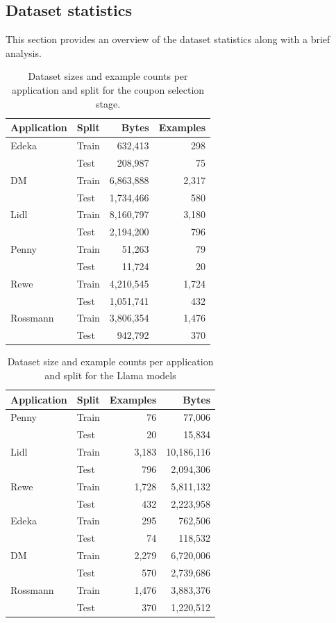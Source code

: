 \documentclass[licencjacka,en]{pracamgr}
\begin{document}
\subsection{Dataset statistics}
This section provides an overview of the dataset statistics along with a brief analysis.

\begin{table}[h!]
\centering
\begin{tabular}{|l|l|r|r|}
\hline
\textbf{Application} & \textbf{Split} & \textbf{Bytes} & \textbf{Examples} \\
\hline
Edeka     & Train & 632,413  & 298 \\
          & Test  & 208,987  & 75 \\
DM        & Train & 6,863,888 & 2,317 \\
          & Test  & 1,734,466 & 580 \\
Lidl      & Train & 8,160,797 & 3,180 \\
          & Test  & 2,194,200 & 796 \\
Penny     & Train & 51,263   & 79 \\
          & Test  & 11,724   & 20 \\
Rewe      & Train & 4,210,545 & 1,724 \\
          & Test  & 1,051,741 & 432 \\
Rossmann  & Train & 3,806,354 & 1,476 \\
          & Test  & 942,792  & 370 \\
\hline
\end{tabular}
\caption{Dataset sizes and example counts per application and split for the coupon selection stage.}
\end{table}

\begin{table}[h!]
\centering
\begin{tabular}{|l|l|r|r|}
\hline
\textbf{Application} & \textbf{Split} & \textbf{Examples} & \textbf{Bytes} \\
\hline
Penny     & Train & 76  & 77,006 \\
          & Test  & 20  & 15,834 \\
Lidl      & Train & 3,183 & 10,186,116 \\
          & Test  & 796  & 2,094,306 \\
Rewe      & Train & 1,728 & 5,811,132 \\
          & Test  & 432  & 2,223,958 \\
Edeka     & Train & 295  & 762,506 \\
          & Test  & 74   & 118,532 \\
DM        & Train & 2,279 & 6,720,006 \\
          & Test  & 570  & 2,739,686 \\
Rossmann  & Train & 1,476 & 3,883,376 \\
          & Test  & 370  & 1,220,512 \\
\hline
\end{tabular}
\caption{Dataset size and example counts per application and split for the Llama models}
\end{table}
\end{document}
